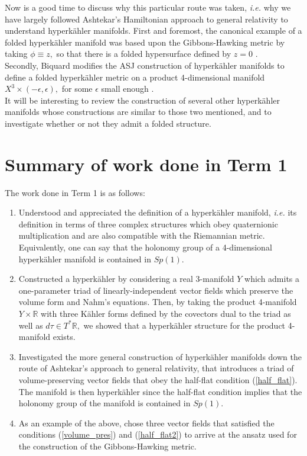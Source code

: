 \documentclass[a4paper,onecolumn,12pt]{article}
\theoremstyle{definition}
\theoremstyle{remark}
\newcommand{\ie}{\emph{i.e.} }
\newcommand{\e}{\epsilon}
\newcommand{\K}{K\"ahler }
\newcommand{\HK}{hyperk\"ahler }
\newcommand{\R}{\mathbb{R}}
\begin{document}
Now is a good time to discuss why this particular route was taken, \ie why we have largely followed Ashtekar's Hamiltonian approach to general relativity to understand \HK manifolds. First and foremost, the canonical example of a folded \HK manifold was based upon the Gibbons-Hawking metric by taking $\phi\equiv z,$ so that there is a folded hypersurface defined by $z=0$ \cite{hitchin_2015}.\\
Secondly, Biquard modifies the ASJ construction of \HK manifolds to define a folded \HK metric on a product 4-dimensional manifold $X^{3}\times(-\e,\e),$ for some $\e$ small enough \cite{biquard_2015}.\\
It will be interesting to review the construction of several other \HK manifolds whose constructions are similar to those two mentioned, and to investigate whether or not they admit a folded structure.

\section{Summary of work done in Term 1}
The work done in Term 1 is as follows:

\begin{enumerate}
	\item Understood and appreciated the definition of a \HK manifold, \ie its definition in terms of three complex structures which obey quaternionic multiplication and are also compatible with the Riemannian metric. Equivalently, one can say that the holonomy group of a 4-dimensional \HK manifold is contained in $Sp(1).$
	\item Constructed a \HK by considering a real 3-manifold $Y$ which admits a one-parameter triad of linearly-independent vector fields which preserve the volume form and Nahm's equations. Then, by taking the product 4-manifold $Y\times\R$ with three \K forms defined by the covectors dual to the triad as well as $d\tau\in T^{*}\R,$ we showed that a \HK structure for the product 4-manifold exists.
	\item Investigated the more general construction of \HK manifolds down the route of Ashtekar's approach to general relativity, that introduces a triad of volume-preserving vector fields that obey the half-flat condition (\ref{half_flat}). The manifold is then \HK since the half-flat condition implies that the holonomy group of the manifold is contained in $Sp(1).$
	\item As an example of the above, chose three vector fields that satisfied the conditions (\ref{volume_pres}) and (\ref{half_flat2}) to arrive at the ansatz used for the construction of the Gibbons-Hawking metric.
\end{enumerate}
\end{document}

